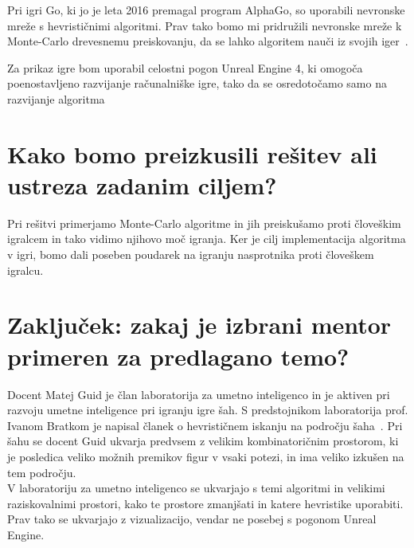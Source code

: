 \documentclass[11pt,a4paper]{article}
\begin{document}
Pri igri Go, ki jo je leta 2016 premagal program AlphaGo, so uporabili nevronske mreže s hevrističnimi algoritmi. 
Prav tako bomo mi pridružili nevronske mreže k Monte-Carlo drevesnemu preiskovanju, da se lahko algoritem nauči iz svojih iger~\cite{chaslot2006monte}.

Za prikaz igre bom uporabil celostni pogon Unreal Engine 4, ki omogoča poenostavljeno razvijanje računalniške igre, tako da se osredotočamo samo na razvijanje algoritma

\section{Kako bomo preizkusili rešitev ali ustreza zadanim ciljem?}
Pri rešitvi primerjamo Monte-Carlo algoritme in jih preiskušamo proti človeškim igralcem in tako vidimo njihovo moč igranja.
Ker je cilj implementacija algoritma v igri, bomo dali poseben poudarek na igranju nasprotnika proti človeškem igralcu.


\section{Zaključek: zakaj je izbrani mentor primeren za predlagano temo?}
Docent Matej Guid je član laboratorija za umetno inteligenco in je aktiven pri razvoju umetne inteligence pri igranju igre šah. 
S predstojnikom laboratorija prof. Ivanom Bratkom je napisal članek o hevrističnem iskanju na področju šaha~\cite{guid2011using}.
Pri šahu se docent Guid ukvarja predvsem z velikim kombinatoričnim prostorom, ki je posledica veliko možnih premikov figur v vsaki potezi, in ima veliko izkušen na tem področju.\\
V laboratoriju za umetno inteligenco se ukvarjajo s temi algoritmi in velikimi raziskovalnimi prostori, kako te prostore zmanjšati in katere hevristike uporabiti.
Prav tako se ukvarjajo z vizualizacijo, vendar ne posebej s pogonom Unreal Engine.




\end{document}
